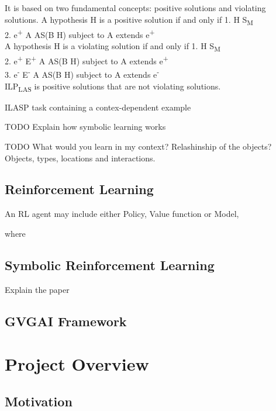 \documentclass[12pt,twoside]{report}
\begin{document}
It is based on two fundamental concepts: positive solutions and violating solutions.
A hypothesis H is a positive solution if and only if
1. H \subseteq S\textsubscript{M} \\
2. \forall e\textsuperscript{+} \in \exists A \in AS(B \cup H) subject to A extends e\textsuperscript{+}\\

A hypothesis H is a violating solution if and only if
1. H \subseteq S\textsubscript{M} \\
2. \forall e\textsuperscript{+} \in E\textsuperscript{+} \exists A \in AS(B \cup H) subject to A extends e\textsuperscript{+}\\
3. \exists e\textsuperscript{-} \in E\textsuperscript{-} \exists A \in AS(B \cup H) subject to A extends e\textsuperscript{-}\\


ILP\textsubscript{LAS} is positive solutions that are not violating solutions. 

ILASP task containing a contex-dependent example

TODO Explain how symbolic learning works

TODO What would you learn in my context? Relashinship of the objects?
Objects, types, locations and interactions.

\section{Reinforcement Learning}

An RL agent may include either Policy, Value function or Model, 

where 


\section{Symbolic Reinforcement Learning}


Explain the paper
\section{GVGAI Framework}


\chapter{Project Overview}
\section{Motivation}
\end{document}
